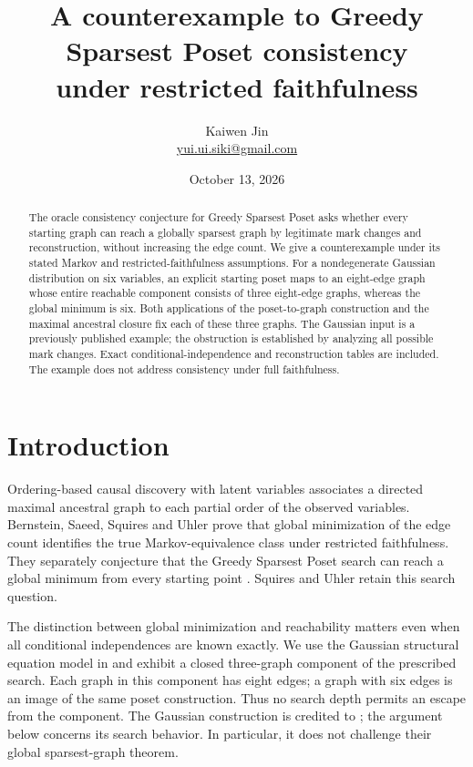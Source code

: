 \documentclass[11pt]{article}
\title{A counterexample to Greedy Sparsest Poset consistency\\under restricted faithfulness}
\author{Kaiwen Jin\\\small\href{mailto:yui.ui.siki@gmail.com}{yui.ui.siki@gmail.com}}
\date{October 13, 2026}
\begin{document}
\maketitle
\begin{abstract}
The oracle consistency conjecture for Greedy Sparsest Poset asks whether
every starting graph can reach a globally sparsest graph by legitimate mark
changes and reconstruction, without increasing the edge count. We give a
counterexample under its stated Markov and restricted-faithfulness assumptions.
For a nondegenerate Gaussian distribution on six variables, an explicit
starting poset maps to an eight-edge graph whose entire reachable component
consists of three eight-edge graphs, whereas the global minimum is six.
Both applications of the poset-to-graph construction and the maximal
ancestral closure fix each of these three graphs. The Gaussian input is a
previously published example; the obstruction is established by analyzing
all possible mark changes. Exact conditional-independence and reconstruction
tables are included. The example does not address consistency under full
faithfulness.
\end{abstract}

\section{Introduction}
Ordering-based causal discovery with latent variables associates a directed
maximal ancestral graph to each partial order of the observed variables.
Bernstein, Saeed, Squires and Uhler \cite[\S\S3--4]{BS20} prove that global
minimization of the edge count identifies the true Markov-equivalence class
under restricted faithfulness. They separately conjecture that the Greedy
Sparsest Poset search can reach a global minimum from every starting point
\cite[Conjecture 1 and Algorithm 2]{BS20}. Squires and Uhler
\cite[\S4.4, p.~1803]{SU23} retain this search question.

The distinction between global minimization and reachability matters even
when all conditional independences are known exactly. We use the Gaussian
structural equation model in \cite[Figure 1, p.~4101]{BS20} and exhibit a
closed three-graph component of the prescribed search. Each graph in this
component has eight edges; a graph with six edges is an image of the same
poset construction. Thus no search depth permits an escape from the component.
The Gaussian construction is credited to \cite{BS20}; the argument below
concerns its search behavior. In particular, it does not challenge their
global sparsest-graph theorem.
\end{document}
